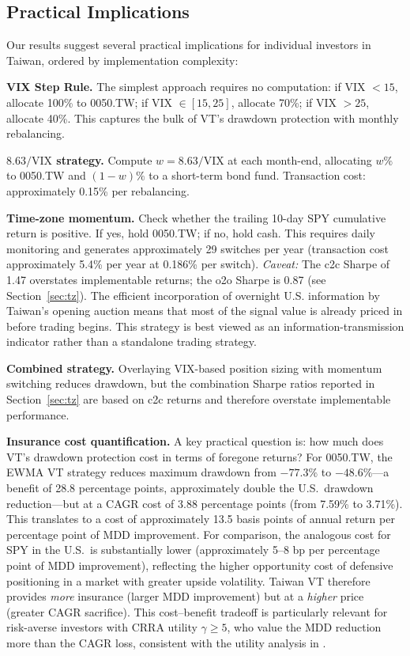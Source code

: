 \subsection{Practical Implications}

Our results suggest several practical implications for individual investors in Taiwan, ordered by implementation complexity:

\textbf{VIX Step Rule.} The simplest approach requires no computation: if VIX $< 15$, allocate 100\% to 0050.TW; if VIX $\in [15, 25]$, allocate 70\%; if VIX $> 25$, allocate 40\%. This captures the bulk of VT's drawdown protection with monthly rebalancing.

\textbf{$8.63/\text{VIX}$ strategy.} Compute $w = 8.63 / \text{VIX}$ at each month-end, allocating $w\%$ to 0050.TW and $(1-w)\%$ to a short-term bond fund. Transaction cost: approximately 0.15\% per rebalancing.

\textbf{Time-zone momentum.} Check whether the trailing 10-day SPY cumulative return is positive. If yes, hold 0050.TW; if no, hold cash. This requires daily monitoring and generates approximately 29 switches per year (transaction cost approximately 5.4\% per year at 0.186\% per switch). \textit{Caveat:} The c2c Sharpe of 1.47 overstates implementable returns; the o2o Sharpe is 0.87 (see Section~\ref{sec:tz}). The efficient incorporation of overnight U.S. information by Taiwan's opening auction means that most of the signal value is already priced in before trading begins. This strategy is best viewed as an information-transmission indicator rather than a standalone trading strategy.

\textbf{Combined strategy.} Overlaying VIX-based position sizing with momentum switching reduces drawdown, but the combination Sharpe ratios reported in Section~\ref{sec:tz} are based on c2c returns and therefore overstate implementable performance.

\textbf{Insurance cost quantification.} A key practical question is: how much does VT's drawdown protection cost in terms of foregone returns? For 0050.TW, the EWMA VT strategy reduces maximum drawdown from $-77.3\%$ to $-48.6\%$---a benefit of 28.8 percentage points, approximately double the U.S.\ drawdown reduction---but at a CAGR cost of 3.88 percentage points (from 7.59\% to 3.71\%). This translates to a cost of approximately 13.5 basis points of annual return per percentage point of MDD improvement. For comparison, the analogous cost for SPY in the U.S.\ is substantially lower (approximately 5--8 bp per percentage point of MDD improvement), reflecting the higher opportunity cost of defensive positioning in a market with greater upside volatility. Taiwan VT therefore provides \textit{more} insurance (larger MDD improvement) but at a \textit{higher} price (greater CAGR sacrifice). This cost--benefit tradeoff is particularly relevant for risk-averse investors with CRRA utility $\gamma \geq 5$, who value the MDD reduction more than the CAGR loss, consistent with the utility analysis in \citet{moreira2017}.

